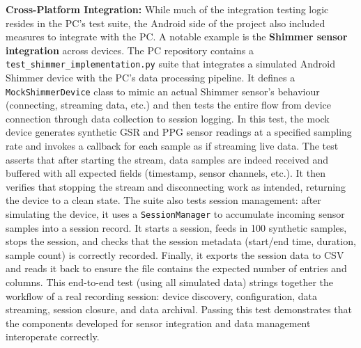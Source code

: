 \textbf{Cross-Platform Integration:} While much of the integration testing logic resides in the PC's test suite, the Android side of the project also included measures to integrate with the PC. A notable example is the \textbf{Shimmer sensor integration} across devices. The PC repository contains a \texttt{test\_shimmer\_implementation.py} suite that integrates a simulated Android Shimmer device with the PC's data processing pipeline. It defines a \texttt{MockShimmerDevice} class to mimic an actual Shimmer sensor's behaviour (connecting, streaming data, etc.) and then tests the entire flow from device connection through data collection to session logging. In this test, the mock device generates synthetic GSR and PPG sensor readings at a specified sampling rate and invokes a callback for each sample as if streaming live data. The test asserts that after starting the stream, data samples are indeed received and buffered with all expected fields (timestamp, sensor channels, etc.). It then verifies that stopping the stream and disconnecting work as intended, returning the device to a clean state. The suite also tests session management: after simulating the device, it uses a \texttt{SessionManager} to accumulate incoming sensor samples into a session record. It starts a session, feeds in 100 synthetic samples, stops the session, and checks that the session metadata (start/end time, duration, sample count) is correctly recorded. Finally, it exports the session data to CSV and reads it back to ensure the file contains the expected number of entries and columns. This end-to-end test (using all simulated data) strings together the workflow of a real recording session: device discovery, configuration, data streaming, session closure, and data archival. Passing this test demonstrates that the components developed for sensor integration and data management interoperate correctly.

